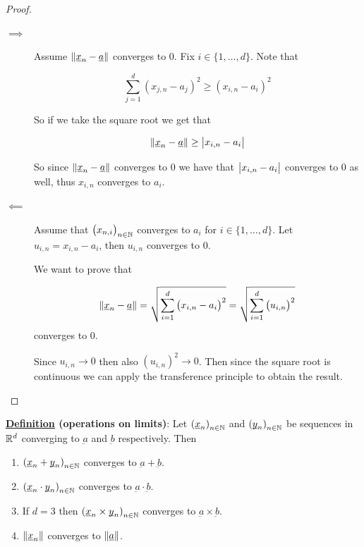 \documentclass[10pt]{extarticle}
\renewcommand{\vec}[1]{\underbar{\ensuremath{#1}}}
\begin{document}
\begin{proof}
    \skiplineafterproof
    \begin{description}
        \item[$\implies$]
            Assume $\norm{\vec{x}_n - \vec{a}}$ converges to 0.
            Fix $i \in \{1, \ldots, d\}$.
            Note that

            $$
                \sum_{j = 1}^d \left(x_{j, n} - a_j\right)^2 \geq \left(x_{i, n} - a_i\right)^2
            $$

            So if we take the square root we get that

            $$
                \norm{\vec{x}_n - \vec{a}} \geq \abs{x_{i, n} - a_i}
            $$

            So since $\norm{\vec{x}_n - \vec{a}}$ converges to 0 we have that $\abs{x_{i, n} - a_i}$ converges to 0 as well, thus $x_{i, n}$ converges to $a_i$.
        \item[$\impliedby$]
            Assume that $\left(x_{n, i}\right)_{n \in \mathbb{N}}$ converges to $a_i$ for $i \in \{1, \ldots, d\}$.
            Let $u_{i, n} = x_{i, n} - a_i$, then $u_{i, n}$ converges to 0.

            We want to prove that

            $$
                \norm{\vec{x}_n - \vec{a}} = \sqrt{\sum_{i=1}^d \left(x_{i, n} - a_i\right)^2} = \sqrt{\sum_{i=1}^d \left(u_{i, n}\right)^2}
            $$
            converges to 0.

            Since $u_{i, n} \to 0$ then also $\left(u_{i, n}\right)^2 \to 0$.
            Then since the square root is continuous we can apply the transference principle to obtain the result.
    \end{description}
\end{proof}

\textbf{\underline{Definition} (operations on limits)}:
Let $\left(\vec{x}_n\right)_{n \in \N}$ and $\left(\vec{y}_n\right)_{n \in \N}$ be sequences in $\mathbb{R}^d$ converging to $\vec{a}$ and $\vec{b}$ respectively.
Then

\begin{enumerate}

    \item $\left(\vec{x}_n + \vec{y}_n\right)_{n \in \N}$ converges to $\vec{a} + \vec{b}$.
    \item $\left(\vec{x}_n \cdot \vec{y}_n\right)_{n \in \N}$ converges to $\vec{a} \cdot \vec{b}$.
    \item If $d = 3$ then $\left(\vec{x}_n \times \vec{y}_n\right)_{n \in \N}$ converges to $\vec{a} \times \vec{b}$.
    \item $\norm{\vec{x}_n}$ converges to $\norm{\vec{a}}$.
\end{enumerate}
\end{document}
